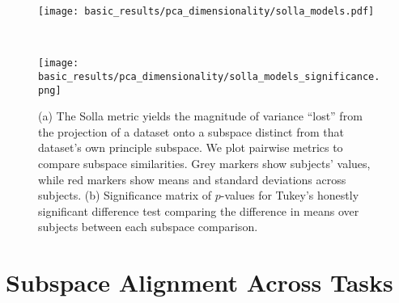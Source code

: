 \documentclass[../main.tex]{subfiles}
\begin{document}
\begin{figure}[!htb]
  \centering
  \begin{minipage}{\textwidth}
    \centering
    \texttt{[image: basic\_results/pca\_dimensionality/solla\_models.pdf]}
    \subcaption{}
  \end{minipage}\\%
  \begin{minipage}{\textwidth}
    \centering
    \texttt{[image: basic\_results/pca\_dimensionality/solla\_models\_significance.png]}
    \subcaption{}
  \end{minipage}
  \caption[Pairwise Solla metric between tasks]{(a) The Solla metric yields the magnitude of variance ``lost'' from the projection of a dataset onto a subspace distinct from that dataset's own principle subspace. We plot pairwise metrics to compare subspace similarities. Grey markers show subjects' values, while red markers show means and standard deviations across subjects. (b) Significance matrix of $p$-values for Tukey's honestly significant difference test comparing the difference in means over subjects between each subspace comparison.}\label{fig:solla_models}
\end{figure}











\section{Subspace Alignment Across Tasks}
\end{document}
